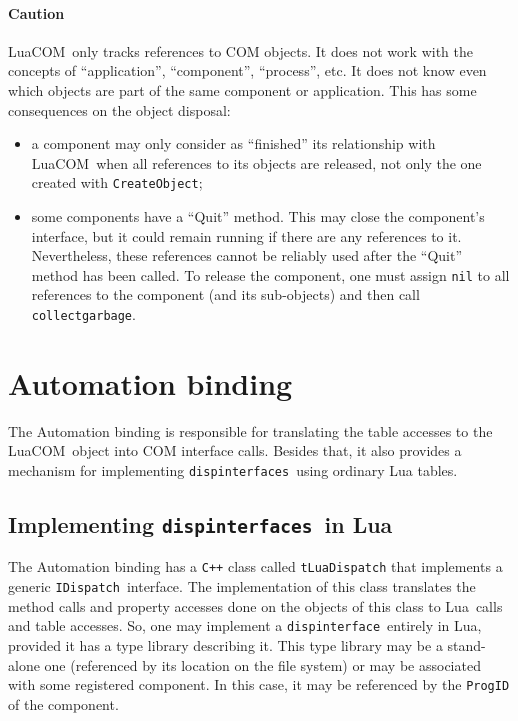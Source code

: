 \documentclass[11pt,a4paper,english]{report}
\newcommand{\ident}[1]{\mbox{\texttt{#1}}}
\newcommand{\techname}[1]{\mbox{#1}}
\newcommand{\lua}{\techname{Lua}}
\newcommand{\luacom}{\techname{LuaCOM}}
\newcommand{\idispatch}{\ident{IDispatch}}
\newcommand{\dispinterface}{\ident{dispinterface}}
\newcommand{\dispinterfaces}{\ident{dispinterfaces}}
\begin{document}
\paragraph{Caution} \luacom\ only tracks references to COM objects. It
does not work with the concepts of ``application'', ``component'',
``process'', etc. It does not know even which objects are part of the
same component or application. This has some consequences on the
object disposal:

\begin{itemize}
\item a component may only consider as ``finished'' its relationship
with \luacom\ when all references to its objects are released, not
only the one created with \ident{CreateObject};
\item some components have a ``Quit'' method. This may close the
component's interface, but it could remain running if there are any
references to it. Nevertheless, these references cannot be reliably
used after the ``Quit'' method has been called. To release the
component, one must assign \ident{nil} to all references to the
component (and its sub-objects) and then call \ident{collectgarbage}.
\end{itemize}




\section{Automation binding}

  The Automation binding is responsible for translating the table
  accesses to the \luacom\ object into COM interface calls. Besides
  that, it also provides a mechanism for implementing \dispinterfaces\
  using ordinary Lua tables.




\subsection{Implementing \dispinterfaces\ in \lua}

The Automation binding has a \ident{C++} class called
\ident{tLuaDispatch} that implements a generic \idispatch\
interface. The implementation of this class translates the method
calls and property accesses done on the objects of this class to \lua\
calls and table accesses. So, one may implement a \dispinterface\
entirely in \lua, provided it has a type library describing it. This
type library may be a stand-alone one (referenced by its location on
the file system) or may be associated with some registered
component. In this case, it may be referenced by the \ident{ProgID} of
the component.
\end{document}
